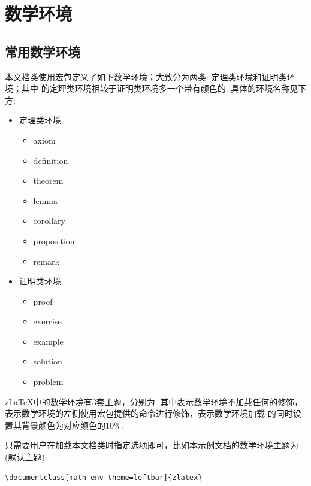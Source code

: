 \section{数学环境}
\subsection{常用数学环境}
本文档类使用宏包定义了如下数学环境；大致分为两类: 定理类环境和证明类环境；其中 
的定理类环境相较于证明类环境多一个带有颜色的. 具体的环境名称见下方:

\begin{multicols}{2}
\begin{itemize}
    \item 定理类环境
        \begin{itemize}
        \item axiom
        \item definition
        \item theorem 
        \item lemma
        \item corollary 
        \item proposition
        \item remark 
        \end{itemize}
    \item 证明类环境
    \begin{itemize}
        \item proof
        \item exercise
        \item example
        \item solution
        \item problem
    \end{itemize}
\end{itemize}    
\end{multicols}

z\LaTeX{}中的数学环境有3套主题，分别为. 其中表示数学环境不加载任何的修饰，
表示数学环境的左侧使用宏包提供的命令进行修饰，表示数学环境加载
的同时设置其背景颜色为对应颜色的10\%. 

只需要用户在加载本文档类时指定选项即可，比如本示例文档的数学环境主题为(默认主题):
\begin{verbatim}
\documentclass[math-env-theme=leftbar]{zlatex}
\end{verbatim}

